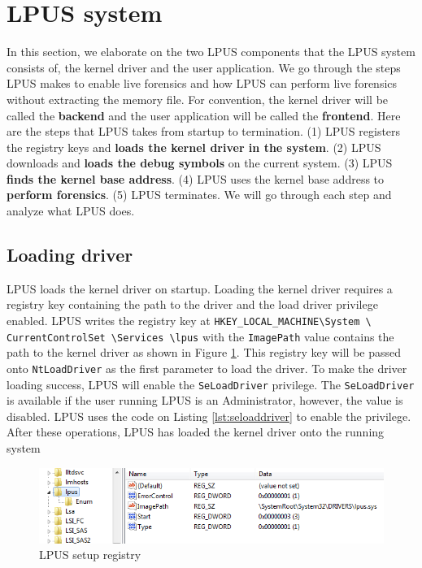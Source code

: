\section[LPUS system]{LPUS system}

In this section, we elaborate on the two LPUS components that the LPUS system
consists of, the kernel driver and the user application. We go through the
steps LPUS makes to enable live forensics and how LPUS can perform live
forensics without extracting the memory file. For convention, the kernel driver
will be called the \textbf{backend} and the user application will be called the
\textbf{frontend}. Here are the steps that LPUS takes from startup to
termination. (1) LPUS registers the registry keys and \textbf{loads the kernel
driver in the system}. (2) LPUS downloads and \textbf{loads the debug symbols}
on the current system.  (3) LPUS \textbf{finds the kernel base address}. (4)
LPUS uses the kernel base address to \textbf{perform forensics}. (5) LPUS
terminates. We will go through each step and analyze what LPUS does.

\subsection[Loading driver]{Loading driver}

LPUS loads the kernel driver on startup. Loading the kernel driver requires a
registry key containing the path to the driver and the load driver privilege
enabled. LPUS writes the registry key at
\texttt{HKEY\_LOCAL\_MACHINE\textbackslash System \textbackslash
CurrentControlSet \textbackslash Services \textbackslash lpus} with the
\texttt{ImagePath} value contains the path to the kernel driver as shown in
Figure \ref{fig:registry}. This registry key will be passed onto
\texttt{NtLoadDriver} as the first parameter to load the driver. To make the
driver loading success, LPUS will enable the \texttt{SeLoadDriver} privilege.
The \texttt{SeLoadDriver} is available if the user running LPUS is an
Administrator, however, the value is disabled. LPUS uses the code on Listing
\ref{lst:seloaddriver} to enable the privilege. After these operations, LPUS
has loaded the kernel driver onto the running system


\begin{figure}[h]
  \centering
  \caption{LPUS setup registry}
  \label{fig:registry}
  \includegraphics[scale=1]{images/registry.png}
\end{figure}

